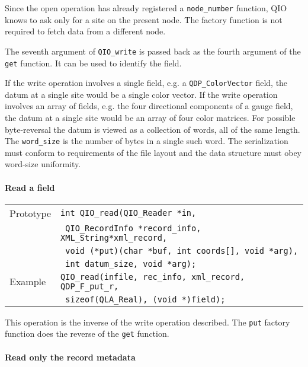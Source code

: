 \documentclass{article}
\newcommand{\QMDhandle}{{\tt XML\_String}}
\begin{document}
Since the open operation has already registered a \verb|node_number|
function, QIO knows to ask only for a site on the present node.  The
factory function is not required to fetch data from a different node.

The seventh argument of \verb|QIO_write| is passed back as the fourth
argument of the \verb|get| function.  It can be used to identify the
field.  

If the write operation involves a single field, e.g. a
\verb|QDP_ColorVector| field, the datum at a single site would be a
single color vector.  If the write operation involves an array of
fields, e.g. the four directional components of a gauge field, the
datum at a single site would be an array of four color matrices.  For
possible byte-reversal the datum is viewed as a collection of words,
all of the same length.  The \verb|word_size| is the number of bytes
in a single such word.  The serialization must conform to requirements
of the file layout and the data structure must obey word-size
uniformity.

\paragraph{Read a field}

\begin{flushleft}
  \begin{tabular}{|l|l|}
  \hline
  Prototype      & \verb|int QIO_read(QIO_Reader *in,| \\
            & \verb| QIO_RecordInfo *record_info,| \QMDhandle \verb|*xml_record, |\\
	    & \verb| void (*put)(char *buf, int coords[], void *arg), |\\
            & \verb| int datum_size, void *arg);| \\
\hline
  Example  & \verb|QIO_read(infile, rec_info, xml_record, QDP_F_put_r, |\\
           & \verb| sizeof(QLA_Real), (void *)field);|\\
   \hline
 \end{tabular}
\end{flushleft}
%
This operation is the inverse of the write operation described.  The
\verb|put| factory function does the reverse of the \verb|get| function.

\paragraph{Read only the record metadata}
\end{document}
